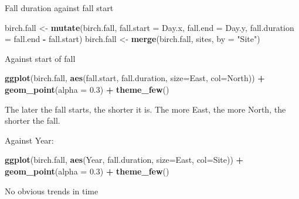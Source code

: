 \documentclass[9pt,ignorenonframetext,aspectratio=169]{beamer}
\newenvironment{Shaded}{\begin{snugshade}}{\end{snugshade}}
\newcommand{\DataTypeTok}[1]{\textcolor[rgb]{0.13,0.29,0.53}{#1}}
\newcommand{\FloatTok}[1]{\textcolor[rgb]{0.00,0.00,0.81}{#1}}
\newcommand{\KeywordTok}[1]{\textcolor[rgb]{0.13,0.29,0.53}{\textbf{#1}}}
\newcommand{\NormalTok}[1]{#1}
\newcommand{\OperatorTok}[1]{\textcolor[rgb]{0.81,0.36,0.00}{\textbf{#1}}}
\newcommand{\StringTok}[1]{\textcolor[rgb]{0.31,0.60,0.02}{#1}}
\begin{document}
\begin{frame}[fragile]{Fall duration against fall start}
\protect\hypertarget{fall-duration-against-fall-start}{}

\scriptsize

\begin{Shaded}
\begin{Highlighting}[]
\NormalTok{birch.fall <-}\StringTok{ }\KeywordTok{mutate}\NormalTok{(birch.fall, }\DataTypeTok{fall.start =}\NormalTok{ Day.x, }\DataTypeTok{fall.end =}\NormalTok{ Day.y, }\DataTypeTok{fall.duration =}\NormalTok{ fall.end }\OperatorTok{-}\StringTok{ }\NormalTok{fall.start)}
\NormalTok{birch.fall <-}\StringTok{ }\KeywordTok{merge}\NormalTok{(birch.fall, sites, }\DataTypeTok{by =} \StringTok{"Site"}\NormalTok{)}
\end{Highlighting}
\end{Shaded}

\bcols
{}
\small

Against start of fall

\scriptsize

\begin{Shaded}
\begin{Highlighting}[]
\KeywordTok{ggplot}\NormalTok{(birch.fall, }\KeywordTok{aes}\NormalTok{(fall.start, fall.duration, }
                       \DataTypeTok{size=}\NormalTok{East, }\DataTypeTok{col=}\NormalTok{North)) }\OperatorTok{+}\StringTok{ }
\StringTok{    }\KeywordTok{geom_point}\NormalTok{(}\DataTypeTok{alpha =} \FloatTok{0.3}\NormalTok{) }\OperatorTok{+}\StringTok{ }\KeywordTok{theme_few}\NormalTok{() }
\end{Highlighting}
\end{Shaded}

\small

The later the fall starts, the shorter it is. The more East, the more
North, the shorter the fall.

\small

Against Year:

\scriptsize

\begin{Shaded}
\begin{Highlighting}[]
\KeywordTok{ggplot}\NormalTok{(birch.fall, }\KeywordTok{aes}\NormalTok{(Year, fall.duration, }
                       \DataTypeTok{size=}\NormalTok{East, }\DataTypeTok{col=}\NormalTok{Site)) }\OperatorTok{+}\StringTok{ }
\StringTok{    }\KeywordTok{geom_point}\NormalTok{(}\DataTypeTok{alpha =} \FloatTok{0.3}\NormalTok{) }\OperatorTok{+}\StringTok{ }\KeywordTok{theme_few}\NormalTok{() }
\end{Highlighting}
\end{Shaded}

\small

No obvious trends in time \ecols

\end{frame}
\end{document}
